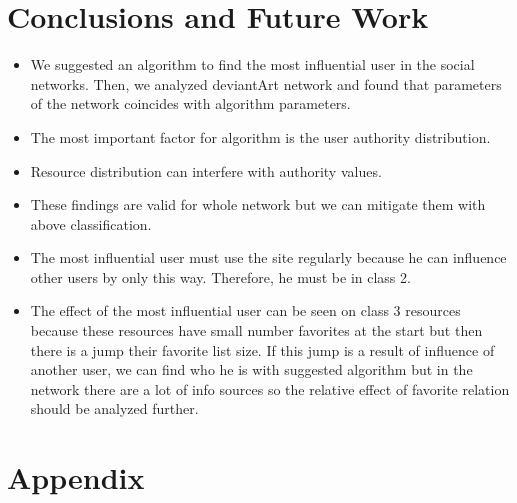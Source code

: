 \documentclass[12pt,a4paper]{report}
\begin{document}
\chapter{Conclusions and Future Work}

	\begin{itemize}
	\item We suggested an algorithm  to find the most influential user in the social networks. Then, we analyzed deviantArt network and found that parameters of the network coincides with algorithm parameters.

	\item The most important factor for algorithm is the user authority distribution.
	\item Resource distribution can interfere with authority values.
	\item These findings are valid for whole network but we can mitigate them with above classification.
	\item The most influential user must use the site regularly because he can influence other users by only this way. Therefore, he must be in class 2.
	\item The effect of the most influential user can be seen on class 3 resources because these resources have small number favorites at the start but then there is a jump their favorite list size. If this jump is a result of influence of another user, we can find who he is  with  suggested algorithm but in the network there are a lot of info sources so the relative  effect of favorite relation should be analyzed further.
	\end{itemize}

\chapter{Appendix}
\end{document}
